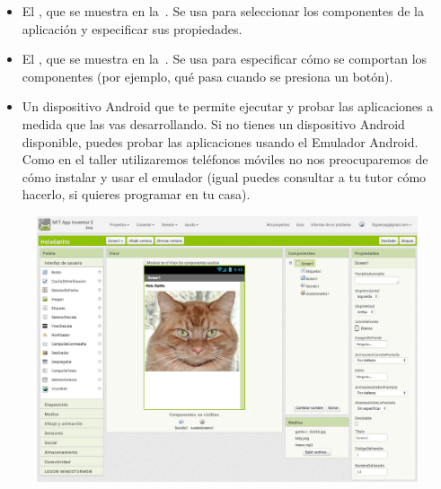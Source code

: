 \documentclass[letterpaper]{article}
\begin{document}
\begin{itemize}

\item El \componentDesigner, que se muestra en la~. Se usa para seleccionar los componentes de la
  aplicación y especificar sus propiedades.

\item El \blockEditor, que se muestra en la~. Se
  usa para especificar cómo se comportan los componentes (por ejemplo,
  qué pasa cuando se presiona un botón).

\item Un dispositivo Android que te permite ejecutar y probar las
  aplicaciones a medida que las vas desarrollando. Si no tienes un
  dispositivo Android disponible, puedes probar las aplicaciones
  usando el Emulador Android. Como en el taller utilizaremos teléfonos
  móviles no nos preocuparemos de cómo instalar y usar el emulador
  (igual puedes consultar a tu tutor cómo hacerlo, si quieres
  programar en tu casa).

\end{itemize}

\begin{figure}[H]
\centering
\includegraphics[scale=0.25]{figures/componentDesigner}
\caption{\componentDesigner}
\label{fig:componentDesigner}
\end{figure}
\end{document}
